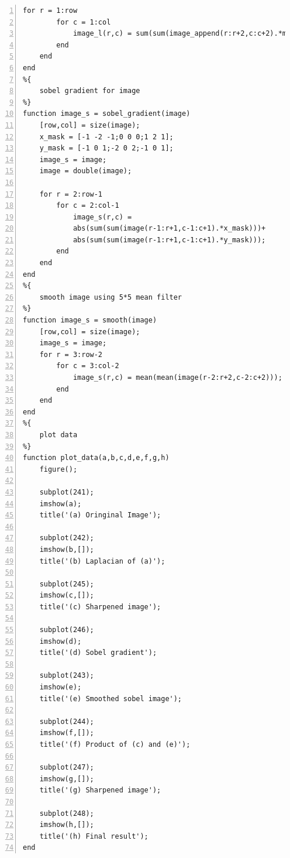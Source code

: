 \documentclass[11pt,oneside]{book}
\begin{document}
\begin{appendices}
\begin{lstlisting}[numbers=left, numberstyle=\tiny,keywordstyle=\color{blue!70},commentstyle=\color{red!50!green!50!blue!50},frame=shadowbox, rulesepcolor=\color{red!20!green!20!blue!20}]
    for r = 1:row
        for c = 1:col
            image_l(r,c) = sum(sum(image_append(r:r+2,c:c+2).*mask));
        end
    end
end
%{
    sobel gradient for image
%}
function image_s = sobel_gradient(image)
    [row,col] = size(image);
    x_mask = [-1 -2 -1;0 0 0;1 2 1];
    y_mask = [-1 0 1;-2 0 2;-1 0 1];
    image_s = image;
    image = double(image);
    
    for r = 2:row-1
        for c = 2:col-1
            image_s(r,c) = 
            abs(sum(sum(image(r-1:r+1,c-1:c+1).*x_mask)))+
            abs(sum(sum(image(r-1:r+1,c-1:c+1).*y_mask)));
        end
    end
end
%{
    smooth image using 5*5 mean filter
%}
function image_s = smooth(image)
    [row,col] = size(image);
    image_s = image;
    for r = 3:row-2
        for c = 3:col-2
            image_s(r,c) = mean(mean(image(r-2:r+2,c-2:c+2)));
        end
    end
end
%{
    plot data
%}
function plot_data(a,b,c,d,e,f,g,h)
    figure();
    
    subplot(241);
    imshow(a);
    title('(a) Oringinal Image');
    
    subplot(242);
    imshow(b,[]);
    title('(b) Laplacian of (a)');
    
    subplot(245);
    imshow(c,[]);
    title('(c) Sharpened image');
    
    subplot(246);
    imshow(d);
    title('(d) Sobel gradient');
    
    subplot(243);
    imshow(e);
    title('(e) Smoothed sobel image');
    
    subplot(244);
    imshow(f,[]);
    title('(f) Product of (c) and (e)');
    
    subplot(247);
    imshow(g,[]);
    title('(g) Sharpened image');
    
    subplot(248);
    imshow(h,[]);
    title('(h) Final result');
end

\end{lstlisting}

\end{appendices}
\end{document}
